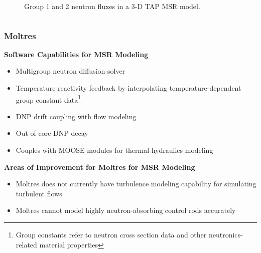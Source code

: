 \begin{frame}
\begin{columns}
\begin{figure}
        \caption{\footnotesize Group 1 and 2 neutron fluxes in a 3-D TAP MSR model.
        \cite{lee_neutronics_2020}}
      \end{figure}
    \hfill
  \end{columns}
\end{frame}

\begin{frame}
  \frametitle{Moltres}
  \begin{block}{\textbf{Software Capabilities for MSR Modeling}}
    \begin{itemize}
  	  \item Multigroup neutron diffusion solver
      \item Temperature reactivity feedback by interpolating temperature-dependent group
        constant data\footnote{Group constants refer to neutron cross section data and other
        neutronics-related material properties}
      \item \gls{DNP} drift coupling with flow modeling
      \item Out-of-core \gls{DNP} decay
      \item Couples with MOOSE modules for thermal-hydraulics modeling
    \end{itemize}
  \end{block}
  \pause
  \begin{block}{\textbf{Areas of Improvement for Moltres for MSR Modeling}}
    \begin{itemize}
      \item Moltres does not currently have turbulence modeling capability for simulating turbulent
        flows
      \item Moltres cannot model highly neutron-absorbing control rods accurately
    \end{itemize}
  \end{block}
\end{frame}

